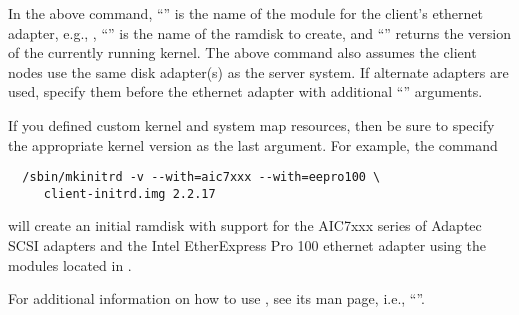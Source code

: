 In the above command, ``'' is the name of the module
for the client's ethernet adapter, e.g., ,
``'' is the name of the ramdisk to create, and
``'' returns the version of the currently running
kernel. The above command also assumes the client nodes use the same
disk adapter(s) as the server system. If alternate adapters are used,
specify them before the ethernet adapter with additional
``'' arguments.

If you defined custom kernel and system map resources, then be sure to
specify the appropriate kernel version as the last argument. For
example, the command

\begin{verbatim}
  /sbin/mkinitrd -v --with=aic7xxx --with=eepro100 \
     client-initrd.img 2.2.17
\end{verbatim}

\noindent will create an initial ramdisk with support for the AIC7xxx
series of Adaptec SCSI adapters and the Intel EtherExpress Pro 100
ethernet adapter using the modules located in
.

For additional information on how to use , see its man
page, i.e., ``\cmd{man mkinitrd}''.

